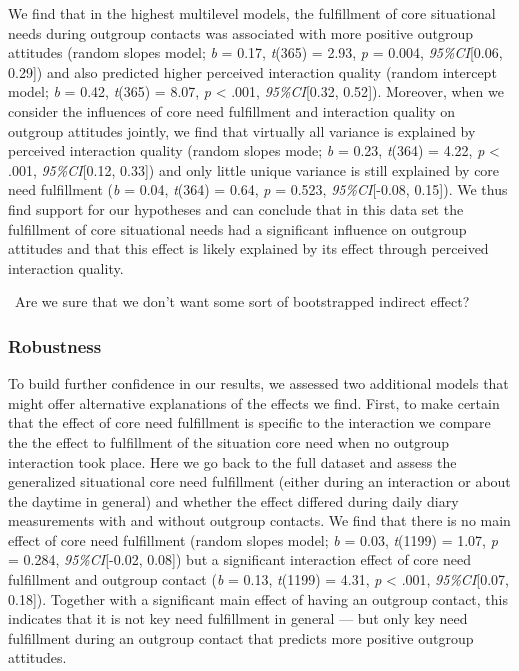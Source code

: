 We find that in the highest multilevel models, the fulfillment of core
situational needs during outgroup contacts was associated with more
positive outgroup attitudes (random slopes model; \textit{b} = 0.17,
\textit{t}(365) = 2.93, \textit{p} = 0.004, \textit{95\%CI}{[}0.06,
0.29{]}) and also predicted higher perceived interaction quality (random
intercept model; \textit{b} = 0.42, \textit{t}(365) = 8.07, \textit{p}
\textless{} .001, \textit{95\%CI}{[}0.32, 0.52{]}). Moreover, when we
consider the influences of core need fulfillment and interaction quality
on outgroup attitudes jointly, we find that virtually all variance is
explained by perceived interaction quality (random slopes mode;
\textit{b} = 0.23, \textit{t}(364) = 4.22, \textit{p} \textless{} .001,
\textit{95\%CI}{[}0.12, 0.33{]}) and only little unique variance is
still explained by core need fulfillment (\textit{b} = 0.04,
\textit{t}(364) = 0.64, \textit{p} = 0.523, \textit{95\%CI}{[}-0.08,
0.15{]}). We thus find support for our hypotheses and can conclude that
in this data set the fulfillment of core situational needs had a
significant influence on outgroup attitudes and that this effect is
likely explained by its effect through perceived interaction quality.

\faQuestionCircle~Are we sure that we don't want some sort of
bootstrapped indirect effect?

\subsubsection{Robustness}

To build further confidence in our results, we assessed two additional
models that might offer alternative explanations of the effects we find.
First, to make certain that the effect of core need fulfillment is
specific to the interaction we compare the the effect to fulfillment of
the situation core need when no outgroup interaction took place. Here we
go back to the full dataset and assess the generalized situational core
need fulfillment (either during an interaction or about the daytime in
general) and whether the effect differed during daily diary measurements
with and without outgroup contacts. We find that there is no main effect
of core need fulfillment (random slopes model; \textit{b} = 0.03,
\textit{t}(1199) = 1.07, \textit{p} = 0.284, \textit{95\%CI}{[}-0.02,
0.08{]}) but a significant interaction effect of core need fulfillment
and outgroup contact (\textit{b} = 0.13, \textit{t}(1199) = 4.31,
\textit{p} \textless{} .001, \textit{95\%CI}{[}0.07, 0.18{]}). Together
with a significant main effect of having an outgroup contact, this
indicates that it is not key need fulfillment in general --- but only
key need fulfillment during an outgroup contact that predicts more
positive outgroup attitudes.

